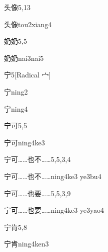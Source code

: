 \begin{entry}{头像}{5,13}
  \begin{phonetics}{头像}{tou2xiang4}
  \end{phonetics}
\end{entry}

\begin{entry}{奶奶}{5,5}
  \begin{phonetics}{奶奶}{nai3nai5}
  \end{phonetics}
\end{entry}

\begin{entry}{宁}{5}[Radical 宀]
  \begin{phonetics}{宁}{ning2}
  \end{phonetics}
  \begin{phonetics}{宁}{ning4}
  \end{phonetics}
\end{entry}

\begin{entry}{宁可}{5,5}
  \begin{phonetics}{宁可}{ning4ke3}
  \end{phonetics}
\end{entry}

\begin{entry}{宁可……也不……}{5,5,3,4}
  \begin{phonetics}{宁可……也不……}{ning4ke3 ye3bu4}
  \end{phonetics}
\end{entry}

\begin{entry}{宁可……也要……}{5,5,3,9}
  \begin{phonetics}{宁可……也要……}{ning4ke3 ye3yao4}
  \end{phonetics}
\end{entry}

\begin{entry}{宁肯}{5,8}
  \begin{phonetics}{宁肯}{ning4ken3}
  \end{phonetics}
\end{entry}

